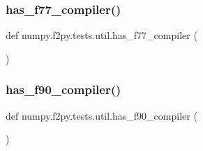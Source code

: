 \subsubsection{\texorpdfstring{has\+\_\+f77\+\_\+compiler()}{has\_f77\_compiler()}}
{\footnotesize\ttfamily def numpy.\+f2py.\+tests.\+util.\+has\+\_\+f77\+\_\+compiler (\begin{DoxyParamCaption}{ }\end{DoxyParamCaption})}

\mbox{\label{namespacenumpy_1_1f2py_1_1tests_1_1util_ac4d4a2456fcc3b712f17c85de57fa8a2}} 
\subsubsection{\texorpdfstring{has\+\_\+f90\+\_\+compiler()}{has\_f90\_compiler()}}
{\footnotesize\ttfamily def numpy.\+f2py.\+tests.\+util.\+has\+\_\+f90\+\_\+compiler (\begin{DoxyParamCaption}{ }\end{DoxyParamCaption})}

